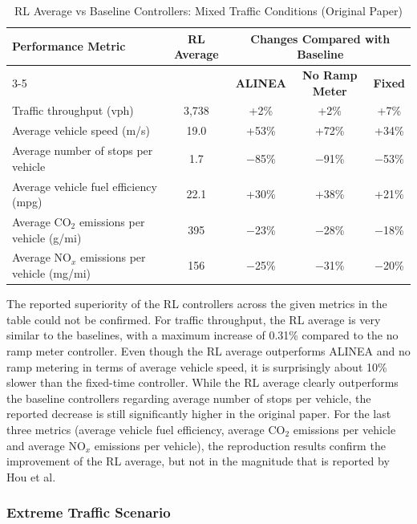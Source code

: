 \begin{table}[H]
\centering
\small
\caption{RL Average vs Baseline Controllers: Mixed Traffic Conditions (Original Paper)}
\begin{tabular}{l c c c c}
\toprule
\multirow{2}{*}{\textbf{Performance Metric}} & \multirow{2}{*}{\textbf{RL Average}} & \multicolumn{3}{c}{\textbf{Changes Compared with Baseline}} \\
\cmidrule(lr){3-5}
 & & \textbf{ALINEA} & \textbf{No Ramp Meter} & \textbf{Fixed} \\
\midrule
Traffic throughput (vph)                      & 3{,}738 & +2\%   & +2\%   & +7\%   \\
Average vehicle speed (m/s)                   & 19.0    & +53\%  & +72\%  & +34\%  \\
Average number of stops per vehicle           & 1.7     & $-$85\% & $-$91\% & $-$53\% \\
Average vehicle fuel efficiency (mpg)         & 22.1    & +30\%  & +38\%  & +21\%  \\
Average CO$_2$ emissions per vehicle (g/mi)   & 395     & $-$23\% & $-$28\% & $-$18\% \\
Average NO$_x$ emissions per vehicle (mg/mi)  & 156     & $-$25\% & $-$31\% & $-$20\% \\
\bottomrule
\end{tabular}
\end{table}

The reported superiority of the RL controllers across the given metrics in the table could not be confirmed. 
For traffic throughput, the RL average is very similar to the baselines, with a maximum increase of 0.31\% compared to the no ramp meter controller. 
Even though the RL average outperforms ALINEA and no ramp metering in terms of average vehicle speed, it is surprisingly about 10\% slower than the fixed-time controller. 
While the RL average clearly outperforms the baseline controllers regarding average number of stops per vehicle, the reported decrease is still significantly higher in the original paper. 
For the last three metrics (average vehicle fuel efficiency, average CO$_2$ emissions per vehicle and average NO$_x$ emissions per vehicle), the reproduction results confirm the improvement of the RL average, but not in the magnitude that is reported by Hou et al. 

\subsubsection{Extreme Traffic Scenario}

